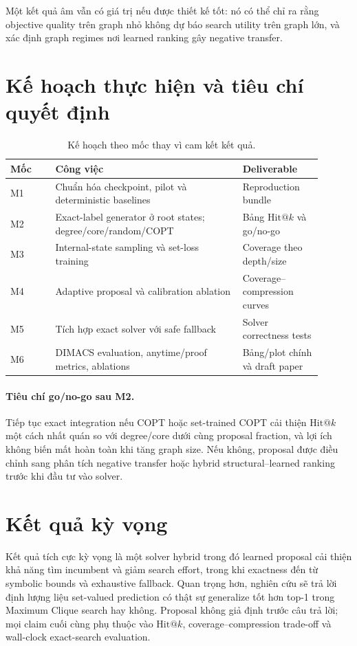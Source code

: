 \documentclass[11pt,a4paper]{article}
\makeatletter
\newcommand{\hitk}{\mathrm{Hit@}k}
\makeatother
\begin{document}
Một kết quả âm vẫn có giá trị nếu được thiết kế tốt: nó có thể chỉ ra rằng objective quality trên graph nhỏ không dự báo search utility trên graph lớn, và xác định graph regimes nơi learned ranking gây negative transfer.

\section{Kế hoạch thực hiện và tiêu chí quyết định}

\begin{table}[ht]
    \centering
    \small
    \caption{Kế hoạch theo mốc thay vì cam kết kết quả.}
    \begin{tabular}{p{0.13\linewidth}p{0.54\linewidth}p{0.23\linewidth}}
        \toprule
        Mốc & Công việc & Deliverable \\
        \midrule
        M1 & Chuẩn hóa checkpoint, pilot và deterministic baselines & Reproduction bundle \\
        M2 & Exact-label generator ở root states; degree/core/random/COPT & Bảng $\hitk$ và go/no-go \\
        M3 & Internal-state sampling và set-loss training & Coverage theo depth/size \\
        M4 & Adaptive proposal và calibration ablation & Coverage--compression curves \\
        M5 & Tích hợp exact solver với safe fallback & Solver correctness tests \\
        M6 & DIMACS evaluation, anytime/proof metrics, ablations & Bảng/plot chính và draft paper \\
        \bottomrule
    \end{tabular}
\end{table}

\paragraph{Tiêu chí go/no-go sau M2.}
Tiếp tục exact integration nếu COPT hoặc set-trained COPT cải thiện $\hitk$ một cách nhất quán so với degree/core dưới cùng proposal fraction, và lợi ích không biến mất hoàn toàn khi tăng graph size. Nếu không, proposal được điều chỉnh sang phân tích negative transfer hoặc hybrid structural--learned ranking trước khi đầu tư vào solver.

\section{Kết quả kỳ vọng}

Kết quả tích cực kỳ vọng là một solver hybrid trong đó learned proposal cải thiện khả năng tìm incumbent và giảm search effort, trong khi exactness đến từ symbolic bounds và exhaustive fallback. Quan trọng hơn, nghiên cứu sẽ trả lời định lượng liệu set-valued prediction có thật sự generalize tốt hơn top-1 trong Maximum Clique search hay không. Proposal không giả định trước câu trả lời; mọi claim cuối cùng phụ thuộc vào $\hitk$, coverage--compression trade-off và wall-clock exact-search evaluation.



\end{document}
